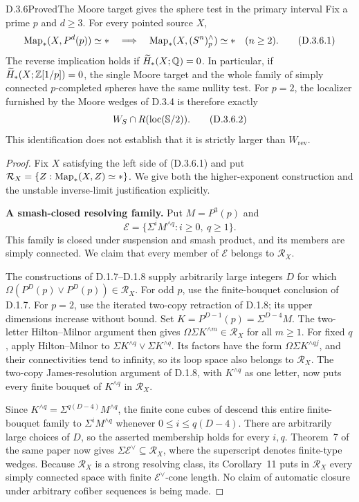 \begin{claim}{D.3.6}{Proved}{The Moore target gives the sphere test in the primary interval}
Fix a prime $p$ and $d\geq3$. For every pointed source $X$,
\[
 \operatorname{Map}_*(X,P^d(p))\simeq *
 \quad\Longrightarrow\quad
 \operatorname{Map}_*(X,(S^n)^{\wedge}_p)\simeq *
                       \quad(n\geq2).
 \tag{D.3.6.1}
\]
The reverse implication holds if
$\widetilde H_*(X;\mathbb Q)=0$. In particular, if
$\widetilde H_*(X;\mathbb Z[1/p])=0$, the single Moore target and
the whole family of simply connected $p$-completed spheres
have the same nullity test. For $p=2$, the localizer furnished
by the Moore wedges of D.3.4 is therefore exactly
\[
                 W_S\cap R(\operatorname{loc}(\mathbb S/2)).
 \tag{D.3.6.2}
\]
This identification does not establish that it is strictly
larger than $W_{\mathrm{rev}}$.
\end{claim}
\begin{proof}
Fix $X$ satisfying the left side of (D.3.6.1) and put
$\mathcal R_X=\{Z:\operatorname{Map}_*(X,Z)\simeq *\}$.
We give both the higher-exponent construction and the
unstable inverse-limit justification explicitly.

\medskip\noindent
\textbf{A smash-closed resolving family.}
Put $M=P^3(p)$ and
\[
 \mathcal E=\{\Sigma^i M^{\wedge q}:i\geq0,\ q\geq1\}.
\]
This family is closed under suspension and smash product,
and its members are simply connected. We claim that every
member of $\mathcal E$ belongs to $\mathcal R_X$.

The constructions of D.1.7--D.1.8 supply arbitrarily large
integers $D$ for which
$\Omega(P^D(p)\vee P^D(p))\in\mathcal R_X$.
For odd $p$, use the finite-bouquet conclusion of D.1.7.
For $p=2$, use the iterated two-copy retraction of D.1.8;
its upper dimensions increase without bound.
Set $K=P^{D-1}(p)=\Sigma^{D-4}M$. The two-letter
Hilton--Milnor argument then gives
$\Omega\Sigma K^{\wedge m}\in\mathcal R_X$ for all $m\geq1$.
For fixed $q$, apply Hilton--Milnor to
$\Sigma K^{\wedge q}\vee\Sigma K^{\wedge q}$.
Its factors have the form $\Omega\Sigma K^{\wedge qj}$,
and their connectivities tend to infinity, so its loop space
also belongs to $\mathcal R_X$. The two-copy
James-resolution argument of D.1.8, with $K^{\wedge q}$ as
one letter, now puts every finite bouquet of $K^{\wedge q}$
in $\mathcal R_X$.

Since
$K^{\wedge q}=\Sigma^{q(D-4)}M^{\wedge q}$,
the finite cone cubes of \cite[Theorem~8]{I_Strom2012}
descend this entire finite-bouquet family to
$\Sigma^iM^{\wedge q}$ whenever $0\leq i\leq q(D-4)$.
There are arbitrarily large choices of $D$, so the asserted
membership holds for every $i,q$.
Theorem~7 of the same paper now gives
$\Sigma\mathcal E^\vee\subseteq\mathcal R_X$, where the
superscript denotes finite-type wedges. Because
$\mathcal R_X$ is a strong resolving class, its Corollary~11
puts in $\mathcal R_X$ every simply connected space with
finite $\mathcal E^\vee$-cone length. No claim of automatic
closure under arbitrary cofiber sequences is being made.


\end{proof}
